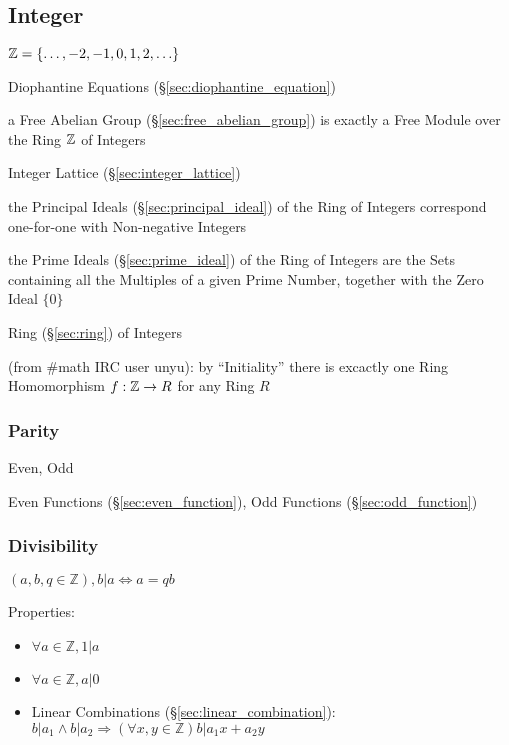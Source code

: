 \subsection{Integer}\label{sec:integer}

$\mathbb{Z} = \{ \ldots, -2, -1, 0, 1, 2, \ldots \}$

\fist Diophantine Equations (\S\ref{sec:diophantine_equation})

\fist a Free Abelian Group (\S\ref{sec:free_abelian_group}) is exactly a Free
Module over the Ring $\mathbb{Z}$ of Integers

\fist Integer Lattice (\S\ref{sec:integer_lattice})

the Principal Ideals (\S\ref{sec:principal_ideal}) of the Ring of Integers
correspond one-for-one with Non-negative Integers

the Prime Ideals (\S\ref{sec:prime_ideal}) of the Ring of Integers are the Sets
containing all the Multiples of a given Prime Number, together with the Zero
Ideal $\{0\}$

Ring (\S\ref{sec:ring}) of Integers

(from \#math IRC user unyu): by ``Initiality'' there is excactly one Ring
Homomorphism $f : \mathbb{Z} \rightarrow R$ for any Ring $R$



\subsubsection{Parity}\label{sec:parity}

Even, Odd

\fist Even Functions (\S\ref{sec:even_function}), Odd Functions
(\S\ref{sec:odd_function})



\subsubsection{Divisibility}\label{sec:divisibility}

$(a,b,q \in \mathbb{Z}), b|a \Leftrightarrow a = qb$

Properties:

\begin{itemize}
\item $\forall a \in \mathbb{Z}, 1|a$
\item $\forall a \in \mathbb{Z}, a|0$
\item Linear Combinations (\S\ref{sec:linear_combination}): $b|a_1
  \wedge b|a_2 \Rightarrow (\forall x,y \in \mathbb{Z})b|a_1 x + a_2
  y$
\end{itemize}



